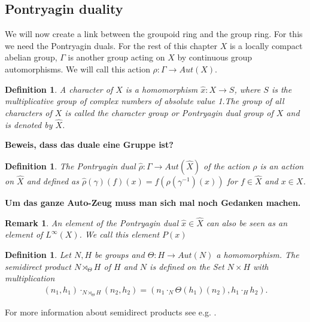 \documentclass[12pt,a4paper]{scrartcl}
\newtheorem{Definition}[Theorem]{Definition}
\newtheorem{Remark}[Theorem]{Remark}
\numberwithin{equation}{section}
\newcommand{\2}{\mathbb{Z} / 2 \mathbb{Z}}
\newcommand{\1}{\overline{1}}
\newcommand{\0}{\overline{0}}
\begin{document}
\subsection{Pontryagin duality}
We will now create a link between the groupoid ring and the group ring. For this we need the Pontryagin duals. For the rest of this chapter $X$ is a locally compact abelian group, $\Gamma$ is another group acting on $X$ by continuous group automorphisms. We will call this action $\rho: \Gamma \to Aut(X)$.
\begin{Definition}
	A character of $X$ is a homomorphism $\hat{x}: X \to S$, where $S$ is the multiplicative group of complex numbers of absolute value 1.The group of all characters of $X$ is called the character group or Pontryagin dual group of $X$ and is denoted by $\hat{X}$.
\end{Definition}
\textbf{Beweis, dass das duale eine Gruppe ist?}
\begin{Definition}
	The Pontryagin dual $\hat{\rho}:\Gamma \to Aut(\hat{X})$ of the action $\rho$ is an action on $\hat{X}$ and defined as $\hat{\rho}(\gamma)(f)(x) = f(\rho(\gamma^{-1})(x))$ for $f \in \hat{X}$ and $x \in X$.
\end{Definition}
\textbf{Um das ganze Auto-Zeug muss man sich mal noch Gedanken machen.}
\begin{Remark}
	An element of the Pontryagin dual $\hat{x} \in \hat{X}$ can also be seen as an element of $L^{\infty}(X)$. We call this element $P(x)$
\end{Remark}
\begin{Definition}
	Let $N, H$ be groups and $\Theta : H \to Aut(N)$ a homomorphism. The semidirect product $N \rtimes_\Theta H$ of $H$ and $N$ is defined on the Set $N \times H$ with multiplication 
	\begin{align*}
		(n_1, h_1) \cdot_{N \rtimes_\Theta H} (n_2, h_2) = (n_1 \cdot_N \Theta(h_1)(n_2), h_1 \cdot_H h_2).
	\end{align*}
\end{Definition}
For more information about semidirect products see e.g. \cite{ALG}.
\end{document}
